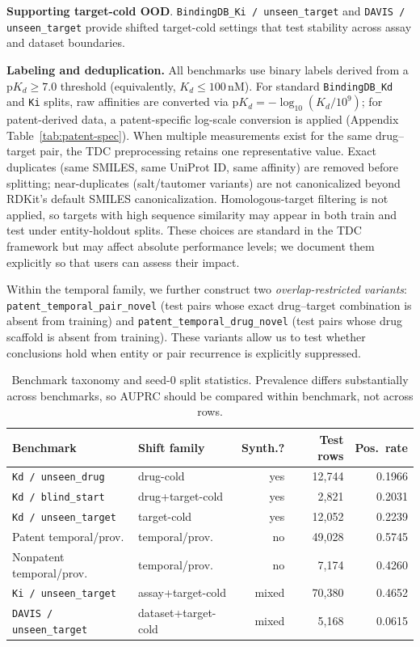 \documentclass[referee,pdflatex,sn-basic,Numbered]{sn-jnl}
\newcommand{\AUPRC}{AUPRC}
\begin{document}
\textbf{Supporting target-cold OOD}. \texttt{BindingDB\_Ki / unseen\_target} and \texttt{DAVIS / unseen\_target} provide shifted target-cold settings that test stability across assay and dataset boundaries.

\textbf{Labeling and deduplication.} All benchmarks use binary labels derived from a $\mathrm{p}K_d \ge 7.0$ threshold (equivalently, $K_d \le 100\,$nM). For standard \texttt{BindingDB\_Kd} and \texttt{Ki} splits, raw affinities are converted via $\mathrm{p}K_d = -\log_{10}(K_d / 10^9)$; for patent-derived data, a patent-specific log-scale conversion is applied (Appendix Table~\ref{tab:patent-spec}). When multiple measurements exist for the same drug--target pair, the TDC preprocessing retains one representative value. Exact duplicates (same SMILES, same UniProt ID, same affinity) are removed before splitting; near-duplicates (salt/tautomer variants) are not canonicalized beyond RDKit's default SMILES canonicalization. Homologous-target filtering is not applied, so targets with high sequence similarity may appear in both train and test under entity-holdout splits. These choices are standard in the TDC framework but may affect absolute performance levels; we document them explicitly so that users can assess their impact.

Within the temporal family, we further construct two \emph{overlap-restricted variants}: \texttt{patent\_temporal\_pair\_novel} (test pairs whose exact drug--target combination is absent from training) and \texttt{patent\_temporal\_drug\_novel} (test pairs whose drug scaffold is absent from training). These variants allow us to test whether conclusions hold when entity or pair recurrence is explicitly suppressed.

\begin{table}[t]
  \centering
  \scriptsize
  \caption{Benchmark taxonomy and seed-0 split statistics. Prevalence differs substantially across benchmarks, so \AUPRC{} should be compared within benchmark, not across rows.}
  \label{tab:taxonomy}
  \setlength{\tabcolsep}{4pt}
  \begin{tabular*}{\textwidth}{@{\extracolsep{\fill}}llrrr@{}}
    \toprule
    Benchmark & Shift family & Synth.? & Test rows & Pos.\ rate \\
    \midrule
    \texttt{Kd / unseen\_drug} & drug-cold & yes & 12,744 & 0.1966 \\
    \texttt{Kd / blind\_start} & drug+target-cold & yes & 2,821 & 0.2031 \\
    \texttt{Kd / unseen\_target} & target-cold & yes & 12,052 & 0.2239 \\
    Patent temporal/prov. & temporal/prov. & no & 49,028 & 0.5745 \\
    Nonpatent temporal/prov. & temporal/prov. & no & 7,174 & 0.4260 \\
    \texttt{Ki / unseen\_target} & assay+target-cold & mixed & 70,380 & 0.4652 \\
    \texttt{DAVIS / unseen\_target} & dataset+target-cold & mixed & 5,168 & 0.0615 \\
    \bottomrule
  \end{tabular*}
\end{table}
\end{document}
